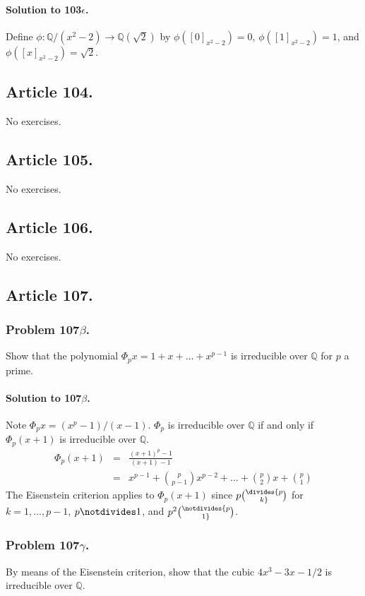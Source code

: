 \paragraph*{Solution to 103$\epsilon$.}
Define $\phi: \mathbb{Q}/(x^2-2) \rightarrow \mathbb{Q}(\sqrt{2})$ by
$\phi([0]_{x^2-2}) = 0$, $\phi([1]_{x^2-2}) = 1$, and $\phi([x]_{x^2-2}) = \sqrt{2}$.
\subsection{Article 104.}

No exercises.
\subsection{Article 105.}

No exercises.
\subsection{Article 106.}

No exercises.
\subsection{Article 107.}

\subsubsection{Problem 107$\beta$.}
Show that the polynomial $\Phi_p x = 1 + x + \dots + x^{p-1}$ is irreducible
over $\mathbb{Q}$ for $p$ a prime.

\paragraph*{Solution to 107$\beta$.}
Note $\Phi_p x = (x^p - 1) / (x - 1)$.
$\Phi_p$ is irreducible over $\mathbb{Q}$ if and only if $\Phi_p(x+1)$ is
irreducible over $\mathbb{Q}$.
\begin{eqnarray*}
\Phi_p(x+1) &=& \frac{(x+1)^p - 1}{(x+1) - 1} \\
&=& x^{p-1} + {{p}\choose{p-1}} x^{p-2} + \dots + {{p}\choose{2}} x + {{p}\choose{1}}
\end{eqnarray*}
The Eisenstein criterion applies to $\Phi_p(x+1)$ since $p \divides {{p}\choose{k}}$
for $k = 1, \dots, p-1$, $p \notdivides 1$, and $p^2 \notdivides {{p}\choose{1}}$.

\subsubsection{Problem 107$\gamma$.}
By means of the Eisenstein criterion, show that the cubic $4x^3-3x-1/2$ is
irreducible over $\mathbb{Q}$.

